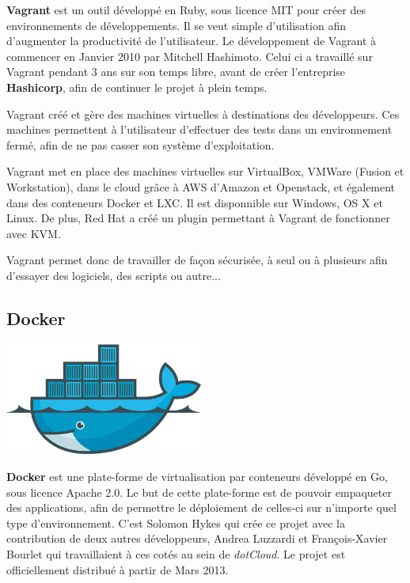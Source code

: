 \documentclass[12pt,a4paper]{article}
\begin{document}
\textbf{Vagrant} est un outil développé en Ruby, sous licence MIT pour créer des environnements de développements. Il se veut simple d'utilisation afin d'augmenter la productivité de l'utilisateur. Le développement de Vagrant à commencer en Janvier 2010 par Mitchell Hashimoto. Celui ci a travaillé sur Vagrant pendant 3 ans sur son temps libre, avant de créer l'entreprise \textbf{Hashicorp}, afin de continuer le projet à plein temps.

Vagrant créé et gère des machines virtuelles à destinations des développeurs. Ces machines permettent à l'utilisateur d'effectuer des tests dans un environnement fermé, afin de ne pas casser son système d'exploitation. 

Vagrant met en place des machines virtuelles sur VirtualBox, VMWare (Fusion et Workstation), dans le cloud grâce à AWS d'Amazon et Openstack, et également dans des conteneurs Docker et LXC. Il est disponnible sur Windows, OS X et Linux. De plus, Red Hat a créé un plugin permettant à Vagrant de fonctionner avec KVM.

Vagrant permet donc de travailler de façon sécurisée, à seul ou à plusieurs afin d'essayer des logiciels, des scripts ou autre...

\subsection{Docker}
\begin{center}
\includegraphics[width=6.5cm]{images_rapport/docker_logo.jpg}
\end{center}

\newpage

\textbf{Docker} est une plate-forme de virtualisation par conteneurs développé en Go, sous licence Apache 2.0. Le but de cette plate-forme est de pouvoir empaqueter des applications, afin de permettre le déploiement de celles-ci sur n'importe quel type d'environnement. C'est Solomon Hykes qui crée ce projet avec la contribution de deux autres développeurs, Andrea Luzzardi et François-Xavier Bourlet qui travaillaient à ces cotés au sein de \textit{dotCloud}. Le projet est officiellement distribué à partir de Mars 2013.
\end{document}

